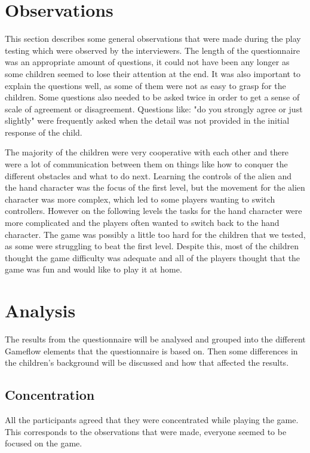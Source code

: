 \section{Observations}
This section describes some general observations that were made during the play testing which were observed by the interviewers. The length of the questionnaire was an appropriate amount of questions, it could not have been any longer as some children seemed to lose their attention at the end. It was also important to explain the questions well, as some of them were not as easy to grasp for the children. Some questions also needed to be asked twice in order to get a sense of scale of agreement or disagreement. Questions like: "do you strongly agree or just slightly" were frequently asked when the detail was not provided in the initial response of the child. 

The majority of the children were very cooperative with each other and there were a lot of communication between them on things like how to conquer the different obstacles and what to do next. Learning the controls of the alien and the hand character was the focus of the first level, but the movement for the alien character was more complex, which led to some players wanting to switch controllers. However on the following levels the tasks for the hand character were more complicated and the players often wanted to switch back to the hand character. The game was possibly a little too hard for the children that we tested, as some were struggling to beat the first level.  Despite this, most of the children thought the game difficulty was adequate and all of the players thought that the game was fun and would like to play it at home.


\section{Analysis}
The results from the questionnaire will be analysed and grouped into the different Gameflow elements that the questionnaire is based on. Then some differences in the children's background will be discussed and how that affected the results.

\subsection{Concentration}
All the participants agreed that they were concentrated while playing the game. This corresponds to the observations that were made, everyone seemed to be focused on the game.

